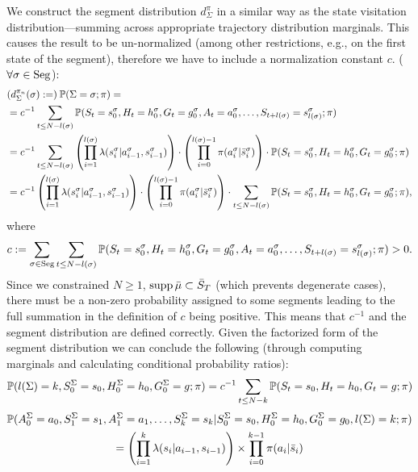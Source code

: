 We construct the segment distribution $d_{\Sigma}^{\pi}$ in a similar way as the state visitation distribution---summing across appropriate trajectory distribution marginals.
This causes the result to be un-normalized (among other restrictions, e.g., on the first state of the segment), therefore we have to include a normalization constant $c$. ($\forall \sigma \in \mathrm{Seg}$):
$$
\begin{aligned}
&(d_{\Sigma}^{\pi_n}(\sigma) :=)\:
\mathbb{P}(\Sigma=\sigma;\pi)
=
\\
&= c^{-1}\sum_{t \leq N -l(\sigma)}
\mathbb{P}(S_t=s_0^{\sigma},H_t=h_0^{\sigma},G_t=g_0^{\sigma},A_t=a_0^{\sigma}, \ldots, S_{t+l(\sigma)}=s_{l(\sigma)}^{\sigma} ;\pi)
\\
&=
c^{-1}
\sum_{t \leq N -l(\sigma)}
\left( \prod_{i=1}^{l(\sigma)}
\mathit{\lambda}(s_{i}^{\sigma} | a_{i-1}^{\sigma}, s_{i-1}^{\sigma})
\right)
\cdot
\left( \prod_{i=0}^{l(\sigma)-1}
\pi(a_i^{\sigma}|\bar{s}_i^{\sigma})
\right)
\cdot
\mathbb{P}(S_t=s_0^{\sigma},H_t=h_0^{\sigma},G_t = g_0^{\sigma};\pi)
\\
&=
c^{-1}
\left( \prod_{i=1}^{l(\sigma)}
\mathit{\lambda}(s_{i}^{\sigma} | a_{i-1}^{\sigma}, s_{i-1}^{\sigma})
\right)
\cdot
\left(\prod_{i=0}^{l(\sigma)-1}
\pi(a_i^{\sigma}|\bar{s}_i^{\sigma})
\right)
\cdot
\sum_{t \leq N -l(\sigma)}
\mathbb{P}(S_t=s_0^{\sigma},H_t=h_0^{\sigma},G_t = g_0^{\sigma};\pi)
,
\end{aligned}
$$
where
$$
c := \sum_{\sigma\in \mathrm{Seg}}
\sum_{t \leq N -l(\sigma)}
\mathbb{P}(S_t=s_0^{\sigma},H_t=h_0^{\sigma},G_t=g_0^{\sigma},A_t=a_0^{\sigma}, \ldots, S_{t+l(\sigma)}=s_{l(\sigma)}^{\sigma} ;\pi) > 0
.
$$
Since we constrained $N\geq 1$, $\operatorname*{\mathrm{supp}} \bar{\mu} \subset \bar{S}_T$ (which prevents 
degenerate cases), there must be a non-zero probability assigned to some segments
leading to the full summation in the definition of $c$ being positive. 
This means that $c^{-1}$ and the segment distribution are defined correctly.
Given the factorized form of the segment distribution we can conclude the following (through computing marginals and calculating conditional probability ratios):
\begin{equation*}
\mathbb{P}(l(\Sigma)=k,S^{\Sigma}_0=s_0,H^{\Sigma}_0=h_0,G^{\Sigma}_0=g;\pi)
=
c^{-1}
\sum_{t \leq N -k}
\mathbb{P}(S_t=s_0,H_t=h_0,G_t = g;\pi)
\end{equation*}
\begin{multline*}
\mathbb{P}(A^{\Sigma}_0=a_0,S^{\Sigma}_1=s_1,A^{\Sigma}_1=a_1,\ldots,S^{\Sigma}_k=s_k
|S^{\Sigma}_0=s_0,H^{\Sigma}_0=h_0,G^{\Sigma}_0=g_0,l(\Sigma)=k
;\pi)
\\
=
\left( \prod_{i=1}^{k}
\mathit{\lambda}(s_{i} | a_{i-1}, s_{i-1})
\right)
\times
\prod_{i=0}^{k-1}
\pi(a_i|\bar{s}_i)
\end{multline*}
